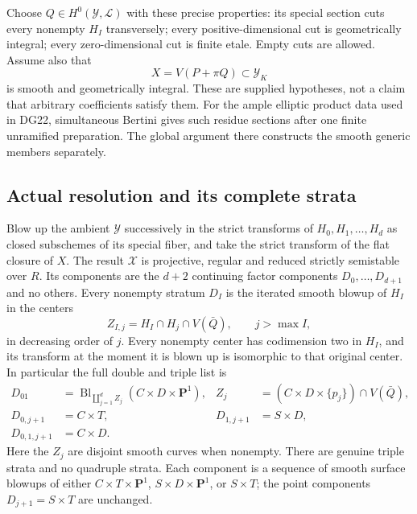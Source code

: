Choose $Q\in H^0(\mathcal Y,\mathcal L)$ with these precise properties:
its special section cuts every nonempty $H_I$ transversely; every
positive-dimensional cut is geometrically integral; every
zero-dimensional cut is finite etale.  Empty cuts are allowed.
Assume also that
\[
                    X=V(P+\pi Q)\subset\mathcal Y_K
 \tag{DS22.3}\label{r22ds:X}
\]
is smooth and geometrically integral.  These are supplied hypotheses,
not a claim that arbitrary coefficients satisfy them.  For the ample
elliptic product data used in DG22, simultaneous Bertini gives such
residue sections after one finite unramified preparation.  The global
argument there constructs the smooth generic members separately.

\subsection{Actual resolution and its complete strata}

\begin{proposition}
\label{r22ds:resolution}
Blow up the ambient $\mathcal Y$ successively in the strict transforms
of $H_0,H_1,\ldots,H_d$ as closed subschemes of its special fiber, and
take the strict transform of the flat closure of $X$.
The result $\mathcal X$ is projective, regular and reduced strictly
semistable over $R$.  Its components are the $d+2$ continuing factor
components $D_0,\ldots,D_{d+1}$ and no others.  Every nonempty
stratum $D_I$ is the iterated smooth blowup of $H_I$ in the centers
\[
              Z_{I,j}=H_I\cap H_j\cap V(\bar Q),\qquad j>\max I,
 \tag{DS22.4}\label{r22ds:centers}
\]
in decreasing order of $j$.  Every nonempty center has codimension
two in $H_I$, and its transform at the moment it is blown up is
isomorphic to that original center.  In particular the full double
and triple list is
\[
\begin{aligned}
 D_{01}&=\operatorname{Bl}_{\coprod_{j=1}^d Z_j}
                          (C\times D\times\mathbf P^1),
 &Z_j&=(C\times D\times\{p_j\})\cap V(\bar Q),\\
 D_{0,j+1}&=C\times T,
 &D_{1,j+1}&=S\times D,\\
 D_{0,1,j+1}&=C\times D.
\end{aligned}
 \tag{DS22.5}\label{r22ds:explicitstrata}
\]
Here the $Z_j$ are disjoint smooth curves when nonempty.  There are
genuine triple strata and no quadruple strata.  Each component is a
sequence of smooth surface blowups of either
$C\times T\times\mathbf P^1$, $S\times D\times\mathbf P^1$,
or $S\times T$; the point components $D_{j+1}=S\times T$ are
unchanged.
\end{proposition}

